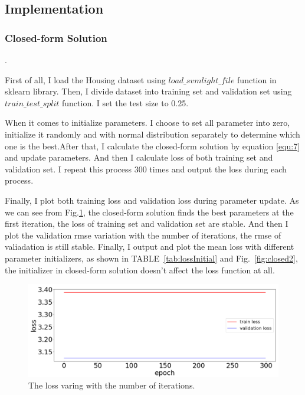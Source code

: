 \documentclass[journal, a4paper]{IEEEtran}
\begin{document}
\subsection{Implementation}

\subsubsection{Closed-form Solution}
.

First of all, I load the Housing dataset using $load\_svmlight\_file$ function in sklearn library. Then, I divide dataset into training set and validation set using $train\_test\_split$ function. I set the test size to 0.25.

When it comes to initialize parameters. I choose to set all parameter into zero, initialize it randomly and with normal distribution separately to determine which one is the best.After that, I calculate the closed-form solution by equation \ref{equ:7} and update parameters. And then I calculate loss of both training set and validation set. I repeat this process 300 times and output the loss during each process.

Finally, I plot both training loss and validation loss during parameter update. As we can see from Fig.\ref{fig:closed0}, the closed-form solution finds the best parameters at the first iteration, the loss of training set and validation set are stable. And then I plot the validation rmse variation with the number of iterations, the rmse of valiadation is still stable. Finally, I output and plot the mean loss with different parameter initializers, as shown in TABLE~\ref{tab:lossInitial} and Fig.~\ref{fig:closed2}, the initializer in closed-form solution doesn't affect the loss function at all.

	\begin{figure}[!hbt]
		\begin{center}
		\includegraphics[width=\columnwidth]{closed-form0}
		\caption{The loss varing with the number of iterations.}
		\label{fig:closed0}
		\end{center}
	\end{figure}
	
\end{document}

